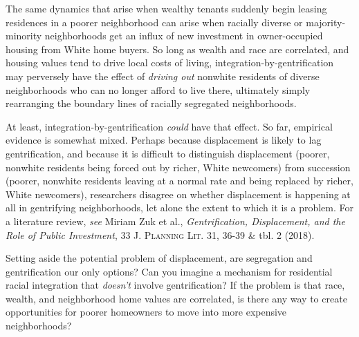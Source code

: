 \begin{questions}[]
 The same dynamics that arise when wealthy tenants suddenly begin
leasing residences in a poorer neighborhood can arise when racially diverse or
majority-minority neighborhoods get an influx of new investment in
owner-occupied housing from White home buyers. So long as wealth and race are
correlated, and housing values tend to drive local costs of living,
integration-by-gentrification may perversely have the effect of \textit{driving
out} nonwhite residents of diverse neighborhoods who can no longer afford to
live there, ultimately simply rearranging the boundary lines of racially
segregated neighborhoods.

At least, integration-by-gentrification \textit{could} have that effect. So far,
empirical evidence is somewhat mixed. Perhaps because displacement is likely to
lag gentrification, and because it is difficult to distinguish displacement
(poorer, nonwhite residents being forced out by richer, White newcomers) from
succession (poorer, nonwhite residents leaving at a normal rate and being
replaced by richer, White newcomers), researchers disagree on whether
displacement is happening at all in gentrifying neighborhoods, let alone the
extent to which it is a problem. For a literature review, \textit{see} Miriam
Zuk et al., \textit{Gentrification, Displacement, and the Role of Public
Investment}, 33 \textsc{J. Planning Lit.} 31, 36-39 \& tbl. 2 (2018). 

Setting aside the potential problem of displacement, are segregation and
gentrification our only options? Can you imagine a mechanism for residential
racial integration that \textit{doesn't} involve gentrification? If the problem
is that race, wealth, and neighborhood home values are correlated, is there any
way to create opportunities for poorer homeowners to move into more expensive
neighborhoods?



\end{questions}
